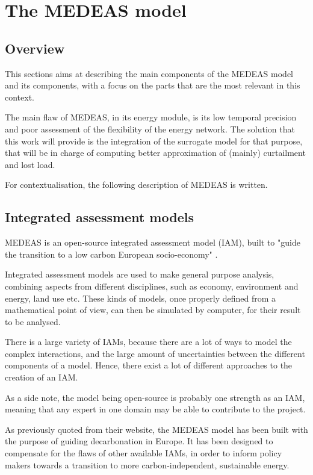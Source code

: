 \section{The MEDEAS model}

\subsection{Overview}

This sections aims at describing the main components of the MEDEAS model and its components, with a focus on the parts that are the most relevant in this context.

The main flaw of MEDEAS, in its energy module, is its low temporal precision and poor assessment of the flexibility of the energy network.  The solution that this work will provide is the integration of the surrogate model for that purpose, that will be in charge of computing better approximation of (mainly) curtailment and lost load.

For contextualisation, the following description of MEDEAS is written.

\subsection{Integrated assessment models}

MEDEAS is an open-source integrated assessment model (IAM), built to "guide the transition to a low carbon European socio-economy" \cite{medeas-website}.

Integrated assessment models are used to make general purpose analysis, combining aspects from different disciplines, such as economy, environment and energy, land use etc. These kinds of models, once properly defined from a mathematical point of view, can then be simulated by computer, for their result to be analysed.

There is a large variety of IAMs, because there are a lot of ways to model the complex interactions, and the large amount of uncertainties between the different components of a model. Hence, there exist a lot of different approaches to the creation of an IAM.

As a side note, the model being open-source is probably one strength as an IAM, meaning that any expert in one domain may be able to contribute to the project.

As previously quoted from their website, the MEDEAS model has been built with the purpose of guiding decarbonation in Europe. It has been designed to compensate for the flaws of other available IAMs, in order to inform policy makers towards a transition to more carbon-independent, sustainable energy.

